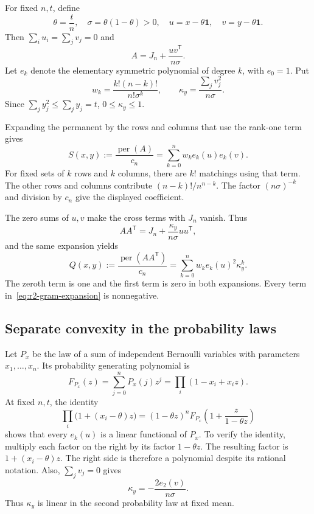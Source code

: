 \documentclass[11pt,a4paper]{article}
\theoremstyle{definition}
\theoremstyle{remark}
\newcommand{\per}{\operatorname{per}}
\newcommand{\T}{\mathsf{T}}
\begin{document}
For fixed $n,t$, define
\[
\theta=\frac tn,\quad \sigma=\theta(1-\theta)>0,
\quad u=x-\theta\mathbf1,\quad v=y-\theta\mathbf1.
\]
Then $\sum_i u_i=\sum_jv_j=0$ and
\begin{equation}\label{eq:r2-centered}
A=J_n+\frac{uv^\T}{n\sigma}.
\end{equation}
Let $e_k$ denote the elementary symmetric polynomial of degree $k$, with $e_0=1$.
Put
\[
w_k=\frac{k!(n-k)!}{n!\sigma^k},
\qquad \kappa_y=\frac{\sum_jv_j^2}{n\sigma}.
\]
Since $\sum_j y_j^2\le\sum_jy_j=t$, $0\le\kappa_y\le1$.

Expanding the permanent by the rows and columns that use the rank-one term gives
\begin{equation}\label{eq:r2-cross-expansion}
S(x,y):=\frac{\per(A)}{c_n}
=\sum_{k=0}^n w_k e_k(u)e_k(v).
\end{equation}
For fixed sets of $k$ rows and $k$ columns, there are $k!$ matchings using that term.
The other rows and columns contribute $(n-k)!/n^{n-k}$.
The factor $(n\sigma)^{-k}$ and division by $c_n$ give the displayed coefficient.

The zero sums of $u,v$ make the cross terms with $J_n$ vanish.
Thus
\[
AA^\T=J_n+\frac{\kappa_y}{n\sigma}uu^\T,
\]
and the same expansion yields
\begin{equation}\label{eq:r2-gram-expansion}
Q(x,y):=\frac{\per(AA^\T)}{c_n}
=\sum_{k=0}^n w_k e_k(u)^2\kappa_y^k.
\end{equation}
The zeroth term is one and the first term is zero in both expansions.
Every term in~\eqref{eq:r2-gram-expansion} is nonnegative.

\subsection{Separate convexity in the probability laws}

Let $P_x$ be the law of a sum of independent Bernoulli variables with parameters $x_1,\ldots,x_n$.
Its probability generating polynomial is
\[
F_{P_x}(z)=\sum_{j=0}^nP_x(j)z^j=\prod_i(1-x_i+x_i z).
\]
At fixed $n,t$, the identity
\begin{equation}\label{eq:r2-law-transform}
\prod_i\bigl(1+(x_i-\theta)z\bigr)
=(1-\theta z)^n F_{P_x}\!\left(1+\frac{z}{1-\theta z}\right)
\end{equation}
shows that every $e_k(u)$ is a linear functional of $P_x$.
To verify the identity, multiply each factor on the right by its factor $1-\theta z$.
The resulting factor is $1+(x_i-\theta)z$.
The right side is therefore a polynomial despite its rational notation.
Also, $\sum_jv_j=0$ gives
\begin{equation}\label{eq:r2-kappa-linear}
\kappa_y=-\frac{2e_2(v)}{n\sigma}.
\end{equation}
Thus $\kappa_y$ is linear in the second probability law at fixed mean.
\end{document}
